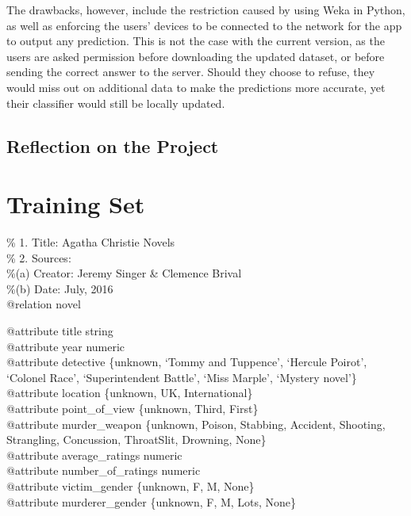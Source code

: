 \documentclass{mproj}
\begin{document}
The drawbacks, however, include the restriction caused by using Weka in Python, as well as enforcing the users' devices to be connected to the network for the app to output any prediction. This is not the case with the current version, as the users are asked permission before downloading the updated dataset, or before sending the correct answer to the server. Should they choose to refuse, they would miss out on additional data to make the predictions more accurate, yet their classifier would still be locally updated.

\section{Reflection on the Project}





\appendix


\chapter{Training Set}\label{dataset}

\% 1. Title: Agatha Christie Novels\\
\% 2. Sources:\\
\%\hspace{5mm}(a) Creator: Jeremy Singer \& Clemence Brival\\
\%\hspace{5mm}(b) Date: July, 2016\\
@relation novel

@attribute title string\\
@attribute year numeric\\
@attribute detective \{unknown, `Tommy and Tuppence', `Hercule Poirot', `Colonel Race', `Superintendent Battle', `Miss Marple', `Mystery novel'\}\\
@attribute location \{unknown, UK, International\}\\
@attribute point\_of\_view \{unknown, Third, First\}\\
@attribute murder\_weapon \{unknown, Poison, Stabbing, Accident, Shooting, Strangling, Concussion, ThroatSlit, Drowning, None\}\\
@attribute average\_ratings numeric\\
@attribute number\_of\_ratings numeric\\
@attribute victim\_gender \{unknown, F, M, None\}\\
@attribute murderer\_gender \{unknown, F, M, Lots, None\}
\end{document}
